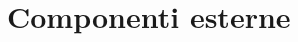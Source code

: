 \documentclass[../ManualeSviluppatore.tex]{subfiles}
\begin{document}
\section{Componenti esterne}
\end{document}
